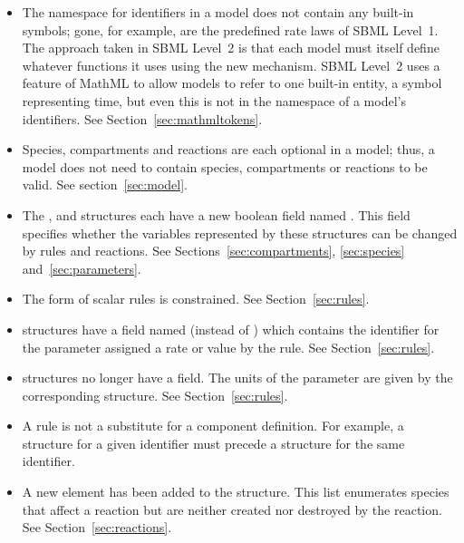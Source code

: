 \documentclass[10pt,twocolumntoc]{cekarticle}
\begin{document}
\begin{itemize}
\item The namespace for identifiers in a model does not contain any
  built-in symbols; gone, for example, are the predefined rate laws of SBML
  Level~1.  The approach taken in SBML Level~2 is that each model must
  itself define whatever functions it uses using the new
   mechanism.  SBML Level~2 uses a feature of
  MathML to allow models to refer to one built-in entity, a symbol
  representing time, but even this is not in the namespace of a model's
  identifiers.  See Section~\ref{sec:mathmltokens}.
  
\item Species, compartments and reactions are each optional in a model;
  thus, a model does not need to contain species, compartments or reactions
  to be valid.  See section~\ref{sec:model}.
  
\item The ,  and 
  structures each have a new boolean field named .  This
  field specifies whether the variables represented by these structures
  can be changed by rules and reactions.  See
  Sections~\ref{sec:compartments}, \ref{sec:species}
  and~\ref{sec:parameters}.
 
\item The form of scalar rules is constrained.  See
  Section~\ref{sec:rules}.
  
\item {} structures have a field named
   (instead of ) which contains the
  identifier for the parameter assigned a rate or value by the rule.  See
  Section~\ref{sec:rules}.
  
\item {} structures no longer have a 
  field.  The units of the parameter are given by the corresponding
   structure.  See Section~\ref{sec:rules}.

\item A rule is not a substitute for a component definition.  For example,
  a  structure for a given identifier must precede a
   structure for the same identifier.
  
\item A new  element has been added to the
   structure.  This list enumerates species that affect a
  reaction but are neither created nor destroyed by the reaction.  See
  Section~\ref{sec:reactions}.
  

\end{itemize}
\end{document}
